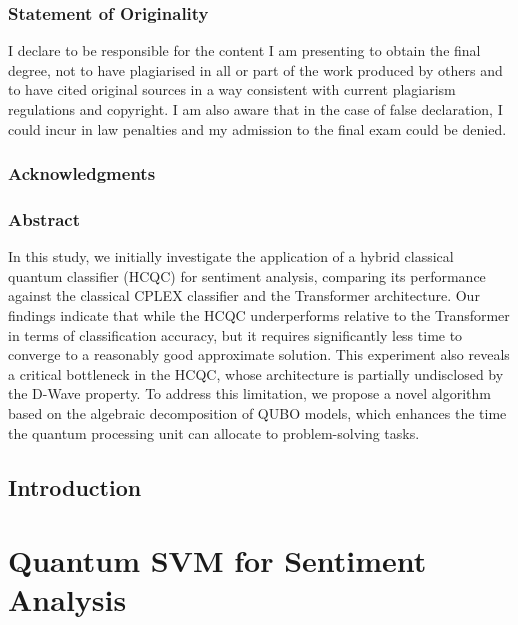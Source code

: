 \documentclass[11pt, oneside]{book}
\begin{document}

\newpage

\vfill
\section*{Statement of Originality}
I declare to be responsible for the content I am presenting to obtain the final degree, not to have plagiarised in all or part of the work produced by others and to have cited original sources in a way consistent with current plagiarism regulations and copyright. I am also aware that in the case of false declaration, I could incur in law penalties and my admission to the final exam could be denied.
\newpage

\section*{Acknowledgments}

\newpage

\section*{Abstract}
In this study, we initially investigate the application of a hybrid classical quantum classifier (HCQC) for sentiment analysis, comparing its performance against the classical CPLEX classifier and the Transformer architecture. 
Our findings indicate that while the HCQC underperforms relative to the Transformer in terms of classification accuracy, but it requires significantly less time to converge to a reasonably good approximate solution. 
This experiment also reveals a critical bottleneck in the HCQC, whose architecture is partially undisclosed by the D-Wave property. 
To address this limitation, we propose a novel algorithm based on the algebraic decomposition of QUBO models, which enhances the time the quantum processing unit can allocate to problem-solving tasks.

\newpage

\tableofcontents
\newpage

\chapter{Introduction}



\part{Quantum SVM for Sentiment Analysis}
\end{document}

